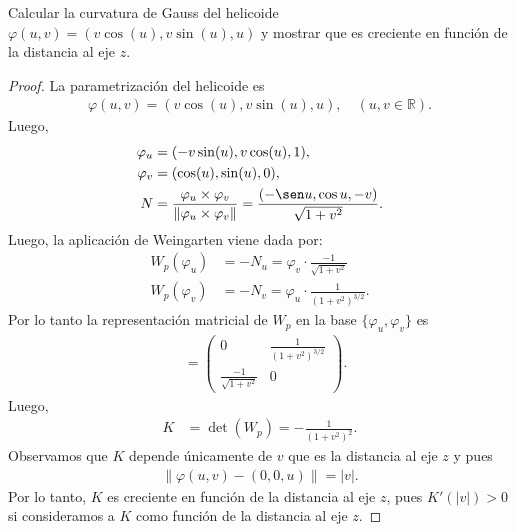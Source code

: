 \documentclass{article}
\newcommand{\R}{\mathbb{R}}
\newenvironment{theorem}[2][Ejercicio]{\begin{trivlist}
\item[\hskip \labelsep {\bfseries #1}\hskip \labelsep {\bfseries #2.}]}{\end{trivlist}}
\begin{document}
\vspace{1em}

\begin{theorem}{3}
    Calcular la curvatura de Gauss del helicoide \( \varphi(u, v) = (v \cos(u), v \sin(u), u) \) y mostrar que es creciente en función de la distancia al eje \( z \).
\end{theorem}

\begin{proof}
    La parametrización del helicoide es \begin{align*}
        \varphi(u, v) = (v \cos(u), v \sin(u), u), \quad (u, v \in \R).
    \end{align*}
    Luego, \begin{align*}
        \varphi_u & = (-v \sin(u), v \cos(u), 1),                                                                                       \\
        \varphi_v & = (\cos(u), \sin(u), 0),                                                                                            \\
        N         & = \frac{\varphi_u \times \varphi_v}{\|\varphi_u \times \varphi_v\|} = \frac{(-\sen u, \cos u, -v)}{\sqrt{1 + v^2}}.
    \end{align*}
    Luego, la aplicación de Weingarten viene dada por: \begin{align*}
        W_p(\varphi_u) & = -N_u = \varphi_v \cdot \frac{-1}{\sqrt{1+v^2}}    \\
        W_p(\varphi_v) & = -N_v = \varphi_u \cdot \frac{1}{{(1+v^2)}^{3/2}}.
    \end{align*}
    Por lo tanto la representación matricial de \( W_p \) en la base \( \{\varphi_u, \varphi_v\} \) es \begin{align*}
        [W_p] & = \begin{pmatrix}
                      0                       & \frac{1}{{(1+v^2)}^{3/2}} \\
                      \frac{-1}{\sqrt{1+v^2}} & 0
                  \end{pmatrix}.
    \end{align*}
    Luego, \begin{align*}
        K & = \det(W_p) = -\frac{1}{{(1+v^2)}^{2}}.
    \end{align*}
    Observamos que \( K \) depende únicamente de \( v \) que es la distancia al eje \( z \) y pues \begin{align*}
        \| \varphi(u, v) - (0, 0, u) \| = |v|.
    \end{align*}
    Por lo tanto, \( K \) es creciente en función de la distancia al eje \( z \), pues \( K'(|v|) > 0 \) si consideramos a \( K \) como función de la distancia al eje \( z \).
\end{proof}
\end{document}
